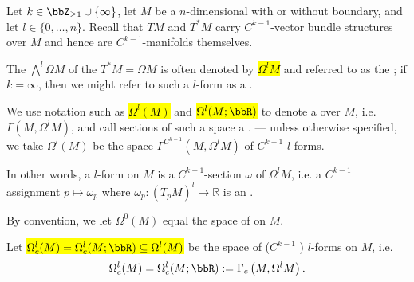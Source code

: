 
\begin{definition}\label{definition:bundle_of_k_forms_n_smooth_manifold}
Let $k \in \bbZ_{\geq 1} \cup \{\infty\}$, let $M$ be a $n$-dimensional  with or without boundary, and let $l \in \{0,\ldots,n\}$. Recall that $TM$ and $T^*M$ carry $C^{k-1}$-vector bundle structures over $M$ and hence are $C^{k-1}$-manifolds themselves.

The  $\bigwedge^l \Omega M$ of the  $T^* M = \Omega M$ is often denoted by \hl{$\Omega^l M$} and referred to as the ; if $k = \infty$, then we might refer to such a $l$-form as a .

We use notation such as \hl{$\Omega^l(M)$} and \hl{$\Omega^l(M;\bbR)$} to denote a  over $M$, i.e. $\Gamma(M, \Omega^l M)$, and call sections of such a space a . --- unless otherwise specified, we take $\Omega^l(M)$ be the space $\Gamma^{C^{k-1}}(M, \Omega^l M)$ of $C^{k-1}$ $l$-forms.

In other words, a $l$-form on $M$ is a $C^{k-1}$-section $\omega$ of $\Omega^l M$, i.e. a $C^{k-1}$ assignment $p \mapsto \omega_p$ where $\omega_p:(T_p M)^l \to \mathbb{R}$ is an  .

By convention, we let $\Omega^0(M)$ equal the space  of  on $M$.

Let \hl{$\Omega_c^l(M) = \Omega_c^l(M; \bbR) \subseteq \Omega^l(M)$} be the space of  ($C^{k-1}$ ) $l$-forms on $M$, i.e. 
$$ \Omega_c^l(M) = \Omega_c^l(M; \bbR) := \Gamma_c\left(M, \Omega^l M \right). $$
\end{definition}